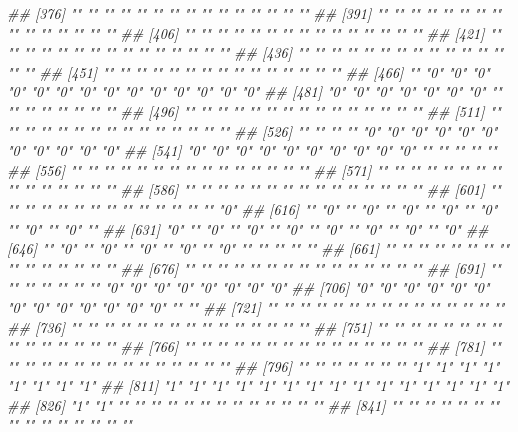 \documentclass[
]{article}
\newenvironment{Shaded}{\begin{snugshade}}{\end{snugshade}}
\newcommand{\CommentTok}[1]{\textcolor[rgb]{0.56,0.35,0.01}{\textit{#1}}}
\begin{document}
\begin{Shaded}
\begin{Highlighting}[]
\CommentTok{##  [376] ""  ""  ""  ""  ""  ""  ""  ""  ""  ""  ""  ""  ""  ""  "" }
\CommentTok{##  [391] ""  ""  ""  ""  ""  ""  ""  ""  ""  ""  ""  ""  ""  ""  "" }
\CommentTok{##  [406] ""  ""  ""  ""  ""  ""  ""  ""  ""  ""  ""  ""  ""  ""  "" }
\CommentTok{##  [421] ""  ""  ""  ""  ""  ""  ""  ""  ""  ""  ""  ""  ""  ""  "" }
\CommentTok{##  [436] ""  ""  ""  ""  ""  ""  ""  ""  ""  ""  ""  ""  ""  ""  "" }
\CommentTok{##  [451] ""  ""  ""  ""  ""  ""  ""  ""  ""  ""  ""  ""  ""  ""  "" }
\CommentTok{##  [466] ""  "0" "0" "0" "0" "0" "0" "0" "0" "0" "0" "0" "0" "0" "0"}
\CommentTok{##  [481] "0" "0" "0" "0" "0" "0" "0" ""  ""  ""  ""  ""  ""  ""  "" }
\CommentTok{##  [496] ""  ""  ""  ""  ""  ""  ""  ""  ""  ""  ""  ""  ""  ""  "" }
\CommentTok{##  [511] ""  ""  ""  ""  ""  ""  ""  ""  ""  ""  ""  ""  ""  ""  "" }
\CommentTok{##  [526] ""  ""  ""  ""  "0" "0" "0" "0" "0" "0" "0" "0" "0" "0" "0"}
\CommentTok{##  [541] "0" "0" "0" "0" "0" "0" "0" "0" "0" "0" ""  ""  ""  ""  "" }
\CommentTok{##  [556] ""  ""  ""  ""  ""  ""  ""  ""  ""  ""  ""  ""  ""  ""  "" }
\CommentTok{##  [571] ""  ""  ""  ""  ""  ""  ""  ""  ""  ""  ""  ""  ""  ""  "" }
\CommentTok{##  [586] ""  ""  ""  ""  ""  ""  ""  ""  ""  ""  ""  ""  ""  ""  "" }
\CommentTok{##  [601] ""  ""  ""  ""  ""  ""  ""  ""  ""  ""  ""  ""  ""  ""  "0"}
\CommentTok{##  [616] ""  "0" ""  "0" ""  "0" ""  "0" ""  "0" ""  "0" ""  "0" "" }
\CommentTok{##  [631] "0" ""  "0" ""  "0" ""  "0" ""  "0" ""  "0" ""  "0" ""  "0"}
\CommentTok{##  [646] ""  "0" ""  "0" ""  "0" ""  "0" ""  "0" ""  ""  ""  ""  "" }
\CommentTok{##  [661] ""  ""  ""  ""  ""  ""  ""  ""  ""  ""  ""  ""  ""  ""  "" }
\CommentTok{##  [676] ""  ""  ""  ""  ""  ""  ""  ""  ""  ""  ""  ""  ""  ""  "" }
\CommentTok{##  [691] ""  ""  ""  ""  ""  ""  ""  "0" "0" "0" "0" "0" "0" "0" "0"}
\CommentTok{##  [706] "0" "0" "0" "0" "0" "0" "0" "0" "0" "0" "0" "0" "0" ""  "" }
\CommentTok{##  [721] ""  ""  ""  ""  ""  ""  ""  ""  ""  ""  ""  ""  ""  ""  "" }
\CommentTok{##  [736] ""  ""  ""  ""  ""  ""  ""  ""  ""  ""  ""  ""  ""  ""  "" }
\CommentTok{##  [751] ""  ""  ""  ""  ""  ""  ""  ""  ""  ""  ""  ""  ""  ""  "" }
\CommentTok{##  [766] ""  ""  ""  ""  ""  ""  ""  ""  ""  ""  ""  ""  ""  ""  "" }
\CommentTok{##  [781] ""  ""  ""  ""  ""  ""  ""  ""  ""  ""  ""  ""  ""  ""  "" }
\CommentTok{##  [796] ""  ""  ""  ""  ""  ""  ""  "1" "1" "1" "1" "1" "1" "1" "1"}
\CommentTok{##  [811] "1" "1" "1" "1" "1" "1" "1" "1" "1" "1" "1" "1" "1" "1" "1"}
\CommentTok{##  [826] "1" "1" ""  ""  ""  ""  ""  ""  ""  ""  ""  ""  ""  ""  "" }
\CommentTok{##  [841] ""  ""  ""  ""  ""  ""  ""  ""  ""  ""  ""  ""  ""  ""  "" }

\end{Highlighting}
\end{Shaded}
\end{document}
